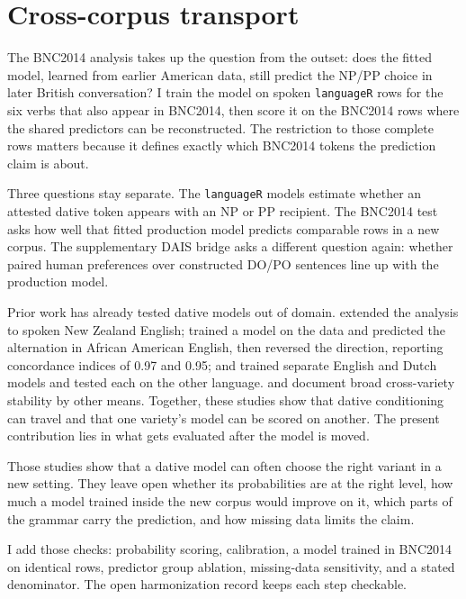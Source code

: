 \section{Cross-corpus transport}

The BNC2014 analysis takes up the question from the outset: does the fitted
model, learned from earlier American data, still predict the NP/PP choice in
later British conversation? I train the model on spoken \texttt{languageR} rows for the six
verbs that also appear in BNC2014, then score it on the BNC2014 rows where the
shared predictors can be reconstructed. The restriction to those complete rows
matters because it defines exactly which BNC2014 tokens the prediction claim is
about.

Three questions stay separate. The \texttt{languageR} models estimate whether
an attested dative token appears with an NP or PP recipient. The BNC2014 test
asks how well that fitted production model predicts comparable rows in a new
corpus. The supplementary DAIS bridge asks a different question again: whether
paired human preferences over constructed DO/PO sentences line up with the
production model.

Prior work has already tested dative models out of domain.
\textcite{BresnanHay2008} extended the \textcite{bresnan2007} analysis to spoken
New Zealand English; \textcite{KendallBresnanVanHerk2011} trained a model on the
\textcite{bresnan2007} data and predicted the alternation in African American
English, then reversed the direction, reporting concordance indices of 0.97 and
0.95; and \textcite{EngelEtAl2025} trained separate English and Dutch models and
tested each on the other language. \textcite{BresnanFord2010} and
\textcite{RothlisbergerGrafmillerSzmrecsanyi2017} document broad cross-variety
stability by other means. Together, these studies show that dative conditioning
can travel and that one variety's model can be scored on another. The present
contribution lies in what gets evaluated after the model is moved.

Those studies show that a dative model can often choose the right variant in a
new setting. They leave open whether its probabilities are at the right level,
how much a model trained inside the new corpus would improve on it, which parts
of the grammar carry the prediction, and how missing data limits the claim.

I add those checks: probability scoring, calibration, a model trained in BNC2014
on identical rows, predictor group ablation, missing-data sensitivity, and a
stated denominator. The open harmonization record keeps each step checkable.

